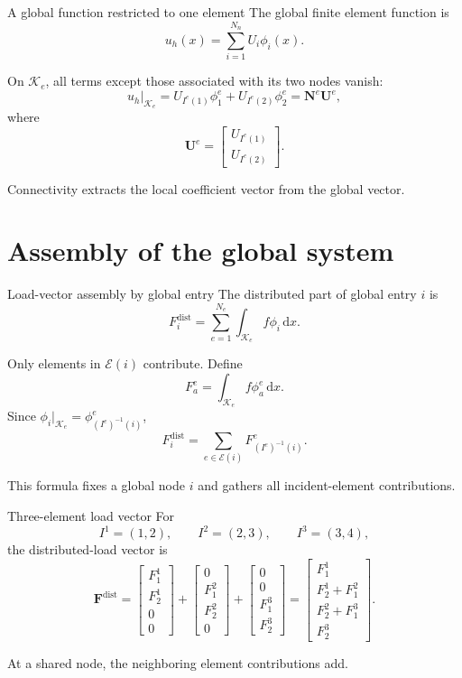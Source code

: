 \documentclass[11pt,aspectratio=169]{beamer}
\newcommand{\dd}{\,\mathrm{d}}
\newcommand{\bF}{\bm F}
\newcommand{\bU}{\bm U}
\begin{document}
\begin{frame}{A global function restricted to one element}
The global finite element function is
\[
  u_h(x)=\sum_{i=1}^{N_n}U_i\phi_i(x).
\]

On $\mathcal K_e$, all terms except those associated with its two nodes vanish:
\[
  u_h|_{\mathcal K_e}
  =U_{I^e(1)}\phi_1^e+U_{I^e(2)}\phi_2^e
  =\bm N^e\bU^e,
\]
where
\[
  \bU^e=
  \begin{bmatrix}
    U_{I^e(1)}\\[2pt]U_{I^e(2)}
  \end{bmatrix}.
\]

Connectivity extracts the local coefficient vector from the global vector.
\end{frame}

\section{Assembly of the global system}

\begin{frame}{Load-vector assembly by global entry}
The distributed part of global entry $i$ is
\[
  F_i^{\mathrm{dist}}
  =\sum_{e=1}^{N_e}\int_{\mathcal K_e}f\phi_i\dd x.
\]

Only elements in $\mathcal E(i)$ contribute. Define
\[
  F_a^e=\int_{\mathcal K_e}f\phi_a^e\dd x.
\]
Since $\phi_i|_{\mathcal K_e}=\phi_{(I^e)^{-1}(i)}^e$,
\[
  \boxed{
  F_i^{\mathrm{dist}}
  =\sum_{e\in\mathcal E(i)}F_{(I^e)^{-1}(i)}^e.}
\]

This formula fixes a global node $i$ and gathers all incident-element
contributions.
\end{frame}

\begin{frame}{Three-element load vector}
For
\[
  I^1=(1,2),\qquad I^2=(2,3),\qquad I^3=(3,4),
\]
the distributed-load vector is
\[
  \bF^{\mathrm{dist}}
  =
  \begin{bmatrix}F_1^1\\F_2^1\\0\\0\end{bmatrix}
  +
  \begin{bmatrix}0\\F_1^2\\F_2^2\\0\end{bmatrix}
  +
  \begin{bmatrix}0\\0\\F_1^3\\F_2^3\end{bmatrix}
  =
  \begin{bmatrix}
    F_1^1\\
    F_2^1+F_1^2\\
    F_2^2+F_1^3\\
    F_2^3
  \end{bmatrix}.
\]

At a shared node, the neighboring element contributions add.
\end{frame}
\end{document}
